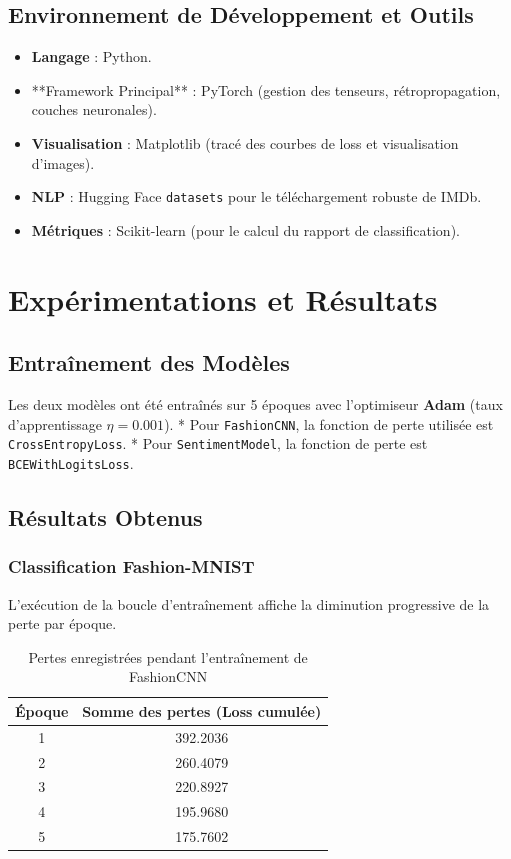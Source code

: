 \documentclass[12pt,a4paper,oneside]{report}
\begin{document}
\section{Environnement de Développement et Outils}
\begin{itemize}
    \item \textbf{Langage} : Python.
    \item **Framework Principal** : PyTorch (gestion des tenseurs, rétropropagation, couches neuronales).
    \item \textbf{Visualisation} : Matplotlib (tracé des courbes de loss et visualisation d'images).
    \item \textbf{NLP} : Hugging Face \texttt{datasets} pour le téléchargement robuste de IMDb.
    \item \textbf{Métriques} : Scikit-learn (pour le calcul du rapport de classification).
\end{itemize}

\chapter{Expérimentations et Résultats}

\section{Entraînement des Modèles}
Les deux modèles ont été entraînés sur 5 époques avec l'optimiseur \textbf{Adam} (taux d'apprentissage $\eta = 0.001$).
*   Pour \texttt{FashionCNN}, la fonction de perte utilisée est \texttt{CrossEntropyLoss}.
*   Pour \texttt{SentimentModel}, la fonction de perte est \texttt{BCEWithLogitsLoss}.

\section{Résultats Obtenus}

\subsection{Classification Fashion-MNIST}
L'exécution de la boucle d'entraînement affiche la diminution progressive de la perte par époque.
\begin{table}[H]
    \centering
    \caption{Pertes enregistrées pendant l'entraînement de FashionCNN}
    \begin{tabular}{cc}
        \toprule
        Époque & Somme des pertes (Loss cumulée) \\
        \midrule
        1 & 392.2036 \\
        2 & 260.4079 \\
        3 & 220.8927 \\
        4 & 195.9680 \\
        5 & 175.7602 \\
        \bottomrule
    \end{tabular}
    \label{tab:loss_fashion}
\end{table}
\end{document}
